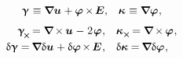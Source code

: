 \begin{otherlanguage}{russian}
\nopagebreak\vspace{-0.1em}
\begin{equation}\label{deformationtensors:micropolarcontinuum}
\begin{array}{rl}
\distortiontensor \hspace{.16ex} \equiv \boldnabla \fieldofdisplacements \hspace{.1ex} + \fieldofrotations \hspace{-0.12ex} \times \hspace{-0.2ex} \bm{E} , &
\wrynesstensor \hspace{.16ex} \equiv \boldnabla \fieldofrotations \hspace{.1ex} ,
\end{array}
\end{equation}
%
\nopagebreak\vspace{-0.85em}
\begin{equation*}
\begin{array}{rl}
\distortiontensor_{\hspace{-0.25ex}\Xcompanion} \hspace{-0.16ex}
= \boldnabla \hspace{-0.16ex} \times \hspace{-0.1ex} \fieldofdisplacements \hspace{.12ex} - \hspace{.12ex} 2 \hspace{.16ex} \fieldofrotations \hspace{.1ex}
, &
\wrynesstensor_{\hspace{.1ex}\Xcompanion} \hspace{-0.16ex}
= \boldnabla \hspace{-0.16ex} \times \hspace{-0.1ex} \fieldofrotations \hspace{.1ex} ,
\\[.3em]
%
\variation{\distortiontensor}
= \hspace{-0.16ex} \boldnabla \variation{\fieldofdisplacements} \hspace{.1ex}
+ \variation{\fieldofrotations} \hspace{-0.2ex} \times \hspace{-0.2ex} \bm{E} \hspace{.1ex}
, &
\variation{\wrynesstensor} = \hspace{-0.16ex} \boldnabla \variation{\fieldofrotations} \hspace{.1ex} ,
\end{array}
\end{equation*}


\end{otherlanguage}
